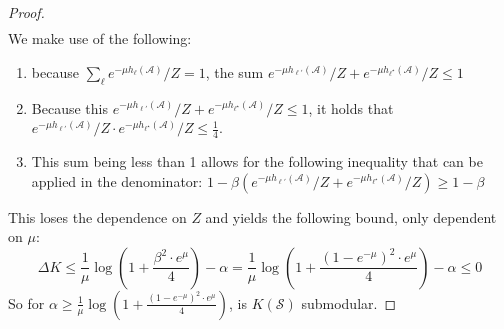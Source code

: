 \documentclass{article}
\def \setA{\mathcal{A}}
\def \setS{\mathcal{S}}
\begin{document}
\begin{proof}
\begin{align*}
\end{align*}
 We make use of the following:
\begin{enumerate}
	\item[(i)] because $\sum_\ell e^{-\mu h_{\ell}(\setA)}/Z =1$, the sum $e^{-\mu h_{\ell'}(\setA)}/Z+e^{-\mu h_{\ell^\star}(\setA)}/Z \leq 1$
	\item [(ii)] Because this $e^{-\mu h_{\ell'}(\setA)}/Z+e^{-\mu h_{\ell^\star}(\setA)}/Z \leq 1$, it holds that $e^{-\mu h_{\ell'}(\setA)}/Z\cdot e^{-\mu h_{\ell^\star}(\setA)}/Z \leq \frac{1}{4}$.
	\item[(iii)] This sum being less than 1 allows for the following inequality that can be applied in the denominator:
	$ 1-\beta(e^{-\mu h_{\ell'}(\setA)}/Z+e^{-\mu h_{\ell^\star}(\setA)}/Z) \geq 1-\beta$
\end{enumerate}
\noindent
This loses the dependence on $Z$ and yields the following bound, only dependent on $\mu$:
\begin{equation}
	\Delta K \leq \frac{1}{\mu} \log \left(1+\frac{\beta^2\cdot e^{\mu}}{4}\right) - \alpha= \frac{1}{\mu} \log \left(1+\frac{(1-e^{-\mu})^2\cdot e^{\mu}}{4}\right)- \alpha \leq 0
\end{equation}
So for $\alpha \geq \frac{1}{\mu} \log \left(1+\frac{(1-e^{-\mu})^2\cdot e^{\mu}}{4}\right)$, is $K(\setS)$ submodular.
\end{proof}
\end{document}
